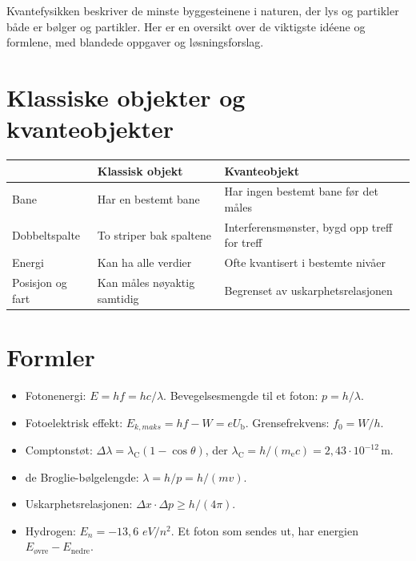 \documentclass[11pt]{article}
\begin{document}

Kvantefysikken beskriver de minste byggesteinene i naturen, der lys og partikler både er bølger og partikler. Her er en oversikt over de viktigste idéene og formlene, med blandede oppgaver og løsningsforslag.

\section*{Klassiske objekter og kvanteobjekter}

\begin{center}\small
\begin{tabularx}{\linewidth}{YYY}
\toprule
\textbf{} & \textbf{Klassisk objekt} & \textbf{Kvanteobjekt} \\
\midrule
Bane & Har en bestemt bane & Har ingen bestemt bane før det måles \\
Dobbeltspalte & To striper bak spaltene & Interferensmønster, bygd opp treff for treff \\
Energi & Kan ha alle verdier & Ofte kvantisert i bestemte nivåer \\
Posisjon og fart & Kan måles nøyaktig samtidig & Begrenset av uskarphetsrelasjonen \\
\bottomrule
\end{tabularx}
\end{center}

\section*{Formler}

\begin{itemize}
\item Fotonenergi: $E = hf = hc/λ$. Bevegelsesmengde til et foton: $p = h/λ$.
\item Fotoelektrisk effekt: $E_{k,maks} = hf - W = eU_{\mathrm{b}}$. Grensefrekvens: $f_{0} = W/h$.
\item Comptonstøt: $Δλ = λ_{\mathrm{C}}(1 - \cos  θ)$, der $λ_{\mathrm{C}} = h/(m_{\mathrm{e}}c) = 2{,}43 \cdot 10^{-12}\,\mathrm{m}$.
\item de Broglie-bølgelengde: $λ = h/p = h/(mv)$.
\item Uskarphetsrelasjonen: $Δx \cdot Δp \geq h/(4π)$.
\item Hydrogen: $E_{n} = -13{,}6$ $eV/n^{2}$. Et foton som sendes ut, har energien $E_{\mathrm{øvre}} - E_{\mathrm{nedre}}$.
\end{itemize}
\end{document}
